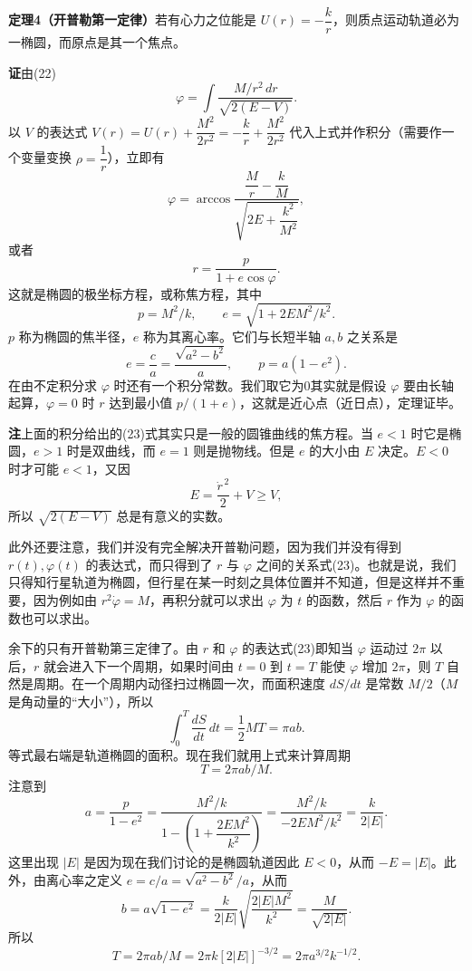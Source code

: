 \noindent\textbf{定理4（开普勒第一定律）}\quad 若有心力之位能是 $U(r)=-\dfrac{k}{r}$，则质点运动轨道必为一椭圆，而原点是其一个焦点。

\noindent\textbf{证}\quad 由(22)
\[
 \varphi=\int\frac{M/r^2\,dr}{\sqrt{2(E-V)}}.
\]
以 $V$ 的表达式 $V(r)=U(r)+\dfrac{M^2}{2r^2}=-\dfrac{k}{r}+\dfrac{M^2}{2r^2}$ 代入上式并作积分（需要作一个变量变换 $\rho=\dfrac1r$），立即有
\[
 \varphi=\arccos\frac{\dfrac Mr-\dfrac kM}{\sqrt{2E+\dfrac{k^2}{M^2}}},
\]
或者
\begin{equation}
 r=\frac{p}{1+e\cos\varphi}.
 \tag{23}
\end{equation}
这就是椭圆的极坐标方程，或称焦方程，其中
\[
 p=M^2/k,\qquad e=\sqrt{1+2EM^2/k^2}.
\]
$p$ 称为椭圆的焦半径，$e$ 称为其离心率。它们与长短半轴 $a,b$ 之关系是
\[
 e=\frac ca=\frac{\sqrt{a^2-b^2}}a,\qquad p=a(1-e^2).
\]
在由不定积分求 $\varphi$ 时还有一个积分常数。我们取它为0其实就是假设 $\varphi$ 要由长轴起算，$\varphi=0$ 时 $r$ 达到最小值 $p/(1+e)$，这就是近心点（近日点），定理证毕。

\noindent\textbf{注}\quad 上面的积分给出的(23)式其实只是一般的圆锥曲线的焦方程。当 $e<1$ 时它是椭圆，$e>1$ 时是双曲线，而 $e=1$ 则是抛物线。但是 $e$ 的大小由 $E$ 决定。$E<0$ 时才可能 $e<1$，又因
\[
 E=\frac{\dot r^{\,2}}2+V\ge V,
\]
所以 $\sqrt{2(E-V)}$ 总是有意义的实数。

此外还要注意，我们并没有完全解决开普勒问题，因为我们并没有得到 $r(t),\varphi(t)$ 的表达式，而只得到了 $r$ 与 $\varphi$ 之间的关系式(23)。也就是说，我们只得知行星轨道为椭圆，但行星在某一时刻之具体位置并不知道，但是这样并不重要，因为例如由 $r^2\dot\varphi=M$，再积分就可以求出 $\varphi$ 为 $t$ 的函数，然后 $r$ 作为 $\varphi$ 的函数也可以求出。

余下的只有开普勒第三定律了。由 $r$ 和 $\varphi$ 的表达式(23)即知当 $\varphi$ 运动过 $2\pi$ 以后，$r$ 就会进入下一个周期，如果时间由 $t=0$ 到 $t=T$ 能使 $\varphi$ 增加 $2\pi$，则 $T$ 自然是周期。在一个周期内动径扫过椭圆一次，而面积速度 $dS/dt$ 是常数 $M/2$（$M$ 是角动量的“大小”），所以
\[
 \int_0^T\frac{dS}{dt}\,dt=\frac12MT=\pi ab.
\]
等式最右端是轨道椭圆的面积。现在我们就用上式来计算周期
\[
 T=2\pi ab/M.
\]
注意到
\[
 a=\frac{p}{1-e^2}
 =\frac{M^2/k}{1-\left(1+\dfrac{2EM^2}{k^2}\right)}
 =\frac{M^2/k}{-2EM^2/k^2}
 =\frac{k}{2|E|}.
\]
这里出现 $|E|$ 是因为现在我们讨论的是椭圆轨道因此 $E<0$，从而 $-E=|E|$。此外，由离心率之定义 $e=c/a=\sqrt{a^2-b^2}/a$，从而
\[
 b=a\sqrt{1-e^2}
 =\frac{k}{2|E|}\sqrt{\frac{2|E|M^2}{k^2}}
 =\frac{M}{\sqrt{2|E|}}.
\]
所以
\begin{equation}
 T=2\pi ab/M=2\pi k[2|E|]^{-3/2}=2\pi a^{3/2}k^{-1/2}.
 \tag{24}
\end{equation}

